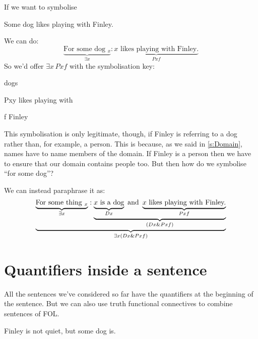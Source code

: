 If we want to symbolise
\begin{earg}
	\item[\ex{lovesesomeonethemselves}] Some dog likes playing with Finley.
\end{earg}
We can do:
\begin{equation*}
\underbrace{\text{For some dog $_x$}}_{\exists x}: \underbrace{\text{$x$ likes playing with Finley.}}_{Pxf}
\end{equation*}
So we'd offer $\exists  x\, Pxf$ with the symbolisation key:
\begin{ekey}
\item[\text{domain}] dogs
\item[Pxy] likes playing with 
\item[f] Finley
\end{ekey}
This symbolisation is only legitimate, though, if Finley is referring to a dog rather than, for example, a person. This is because, as we said in \ref{s:Domain}, names have to name members of the domain. If Finley is a person then we have to ensure that our domain contains people too. But then how do we symbolise ``for some dog''?

We can instead paraphrase it as:
\begin{equation*}
\underbrace{\underbrace{\text{For some thing $_x$}}_{\exists x}: \underbrace{
	\underbrace{\text{$x$ is a dog}}_{Dx}
	\text{ and }
	\underbrace{\text{$x$ likes playing with Finley.}}_{Pxf}
}_{(Dx\mathbin{\&} Pxf)}}_{\exists x (Dx\mathbin{\&} Pxf)}
\end{equation*}

\section{Quantifiers inside a sentence}
All the sentences we've considered so far have the quantifiers at the beginning of the sentence. But we can also use truth functional connectives to combine sentences of FOL.


\begin{earg}
\item[\ex{q.dog}]Finley is not quiet, but some dog is.
\end{earg}

